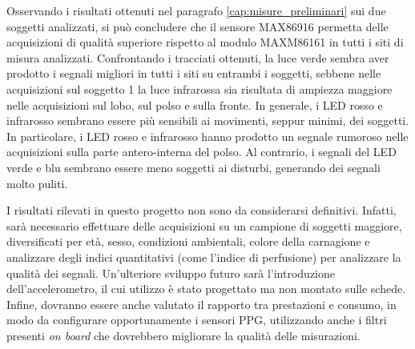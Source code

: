 \documentclass[
	a4paper,
	cleardoublepage=empty,
	headings=twolinechapter,
	numbers=autoenddot,
]{scrbook}
\begin{document}
	Osservando i risultati ottenuti nel paragrafo \ref{cap:misure_preliminari} sui due soggetti analizzati, si può concludere che il sensore MAX86916 permetta delle acquisizioni di qualità superiore rispetto al modulo MAXM86161 in tutti i siti di misura analizzati. Confrontando i tracciati ottenuti, la luce verde sembra aver prodotto i segnali migliori in tutti i siti su entrambi i soggetti, sebbene nelle acquisizioni sul soggetto 1 la luce infrarossa sia risultata di ampiezza maggiore nelle acquisizioni sul lobo, sul polso e sulla fronte. In generale, i LED rosso e infrarosso sembrano essere più sensibili ai movimenti, seppur minimi, dei soggetti. In particolare, i LED rosso e infrarosso hanno prodotto un segnale rumoroso nelle acquisizioni sulla parte antero-interna del polso. Al contrario, i segnali del LED verde e blu sembrano essere meno soggetti ai disturbi, generando dei segnali molto puliti. 
	
	I risultati rilevati in questo progetto non sono da considerarsi definitivi. Infatti, sarà necessario effettuare delle acquisizioni su un campione di soggetti maggiore, diversificati per età, sesso, condizioni ambientali, colore della carnagione e analizzare degli indici quantitativi (come l'indice di perfusione) per analizzare la qualità dei segnali. Un'ulteriore sviluppo futuro sarà l'introduzione dell'accelerometro, il cui utilizzo è stato progettato ma non montato sulle schede. Infine, dovranno essere anche valutato il rapporto tra prestazioni e consumo, in modo da configurare opportunamente i sensori PPG, utilizzando anche i filtri presenti \textit{on board} che dovrebbero migliorare la qualità delle misurazioni.
	
	
	
	
	
	
	
\end{document}
